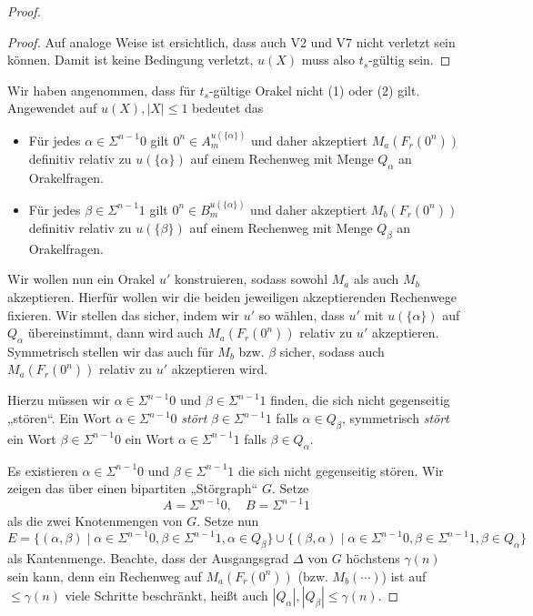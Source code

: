 \begin{proof}
\begin{proof}
    Auf analoge Weise ist ersichtlich, dass auch V2 und V7 nicht verletzt sein können.
    Damit ist keine Bedingung verletzt, $u(X)$ muss also $t_s$-gültig sein.
\end{proof}

Wir haben angenommen, dass für $t_{s}$-gültige Orakel nicht (1) oder (2) gilt. Angewendet auf $u(X), |X|\leq 1$ bedeutet das
\begin{itemize}
    \item Für jedes $\alpha\in \Sigma^{n-1}0$ gilt $0^n\in A_m^{u(\{\alpha\})}$ und daher akzeptiert $M_a(F_r(0^n))$ definitiv relativ zu $u(\{\alpha\})$ auf einem Rechenweg mit Menge $Q_\alpha$ an Orakelfragen.
    \item Für jedes $\beta\in \Sigma^{n-1}1$ gilt $0^n\in B_m^{u(\{\alpha\})}$ und daher akzeptiert $M_b(F_r(0^n))$ definitiv relativ zu $u(\{\beta\})$ auf einem Rechenweg mit Menge $Q_\beta$ an Orakelfragen.
\end{itemize}
Wir wollen nun ein Orakel $u'$ konstruieren, sodass sowohl $M_a$ als auch $M_b$ akzeptieren.
Hierfür wollen wir die beiden jeweiligen akzeptierenden Rechenwege fixieren.
Wir stellen das sicher, indem wir $u'$ so wählen, dass $u'$ mit $u(\{\alpha\})$ auf $Q_\alpha$ übereinstimmt, dann wird auch $M_a(F_r(0^n))$ relativ zu $u'$ akzeptieren.
Symmetrisch stellen wir das auch für $M_b$ bzw. $\beta$ sicher, sodass auch $M_a(F_r(0^n))$ relativ zu $u'$ akzeptieren wird.

Hierzu müssen wir $\alpha\in\Sigma^{n-1}0$ und $\beta\in\Sigma^{n-1}1$ finden, die sich nicht gegenseitig „stören“.
Ein Wort $\alpha\in\Sigma^{n-1}0$ \emph{stört} $\beta\in\Sigma^{n-1}1$ falls $\alpha\in Q_\beta$, 
symmetrisch \emph{stört} ein Wort $\beta\in\Sigma^{n-1}0$ ein Wort  $\alpha\in\Sigma^{n-1}1$ falls $\beta\in Q_\alpha$.

Es existieren $\alpha\in\Sigma^{n-1}0$ und $\beta\in\Sigma^{n-1}1$ die sich nicht gegenseitig stören. Wir zeigen das über einen bipartiten „Störgraph“ $G$.
Setze 
\[ A=\Sigma^{n-1}0,\quad B=\Sigma^{n-1}1 \]
als die zwei Knotenmengen von $G$.
Setze nun
\[ E = \{ (\alpha, \beta) \mid \alpha\in\Sigma^{n-1}0, \beta\in\Sigma^{n-1}1, \alpha\in Q_\beta\} \cup \{ (\beta, \alpha) \mid \alpha\in\Sigma^{n-1}0, \beta\in\Sigma^{n-1}1, \beta\in Q_\alpha\} \]
als Kantenmenge.
Beachte, dass der Ausgangsgrad $\Delta$ von $G$ höchstens $\gamma(n)$ sein kann, denn ein Rechenweg auf $M_a(F_r(0^n))$ (bzw. $M_b(\cdots)$) ist auf $\leq \gamma(n)$ viele Schritte beschränkt, heißt auch $|Q_\alpha|, |Q_\beta|\leq \gamma(n)$.


\end{proof}
